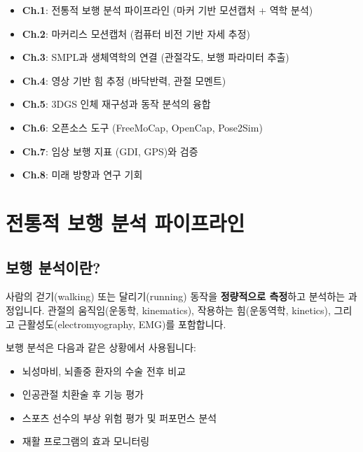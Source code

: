 \documentclass[11pt, a4paper]{report}
\begin{document}
\begin{importantnote}[title={이 교재의 구성}]
\begin{itemize}[leftmargin=*]
  \item \textbf{Ch.1}: 전통적 보행 분석 파이프라인 (마커 기반 모션캡처 + 역학 분석)
  \item \textbf{Ch.2}: 마커리스 모션캡처 (컴퓨터 비전 기반 자세 추정)
  \item \textbf{Ch.3}: SMPL과 생체역학의 연결 (관절각도, 보행 파라미터 추출)
  \item \textbf{Ch.4}: 영상 기반 힘 추정 (바닥반력, 관절 모멘트)
  \item \textbf{Ch.5}: 3DGS 인체 재구성과 동작 분석의 융합
  \item \textbf{Ch.6}: 오픈소스 도구 (FreeMoCap, OpenCap, Pose2Sim)
  \item \textbf{Ch.7}: 임상 보행 지표 (GDI, GPS)와 검증
  \item \textbf{Ch.8}: 미래 방향과 연구 기회
\end{itemize}
\end{importantnote}


\chapter{전통적 보행 분석 파이프라인}
\label{ch:traditional}

\section{보행 분석이란?}

\begin{definition}
사람의 걷기(walking) 또는 달리기(running) 동작을 \textbf{정량적으로 측정}하고 분석하는 과정입니다. 관절의 움직임(운동학, kinematics), 작용하는 힘(운동역학, kinetics), 그리고 근활성도(electromyography, EMG)를 포함합니다.
\end{definition}

보행 분석은 다음과 같은 상황에서 사용됩니다:
\begin{itemize}[leftmargin=*]
  \item 뇌성마비, 뇌졸중 환자의 수술 전후 비교
  \item 인공관절 치환술 후 기능 평가
  \item 스포츠 선수의 부상 위험 평가 및 퍼포먼스 분석
  \item 재활 프로그램의 효과 모니터링
\end{itemize}
\end{document}
